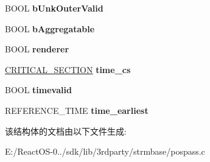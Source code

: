 \begin{DoxyCompactItemize}
\item 
\mbox{\label{struct_pass_thru_impl_a5506b3e5f59bfcb85bfec2037ff21e29}} 
B\+O\+OL {\bfseries b\+Unk\+Outer\+Valid}
\item 
\mbox{\label{struct_pass_thru_impl_a13335e1d4f0b7cf74ace0f6745b37d4e}} 
B\+O\+OL {\bfseries b\+Aggregatable}
\item 
\mbox{\label{struct_pass_thru_impl_ac6b7392aedd95518c49e8def97c3a54f}} 
B\+O\+OL {\bfseries renderer}
\item 
\mbox{\label{struct_pass_thru_impl_a342caf0d49093dd4c7e3dbe891139fc0}} 
\hyperlink{struct___c_r_i_t_i_c_a_l___s_e_c_t_i_o_n}{C\+R\+I\+T\+I\+C\+A\+L\+\_\+\+S\+E\+C\+T\+I\+ON} {\bfseries time\+\_\+cs}
\item 
\mbox{\label{struct_pass_thru_impl_aa407374e7fcf808117596999065b277e}} 
B\+O\+OL {\bfseries timevalid}
\item 
\mbox{\label{struct_pass_thru_impl_a49e10b591d8589ca3be9cb61b9ca88c5}} 
R\+E\+F\+E\+R\+E\+N\+C\+E\+\_\+\+T\+I\+ME {\bfseries time\+\_\+earliest}
\end{DoxyCompactItemize}


该结构体的文档由以下文件生成\+:\begin{DoxyCompactItemize}
\item 
E\+:/\+React\+O\+S-\/0../sdk/lib/3rdparty/strmbase/pospass.\+c\end{DoxyCompactItemize}
